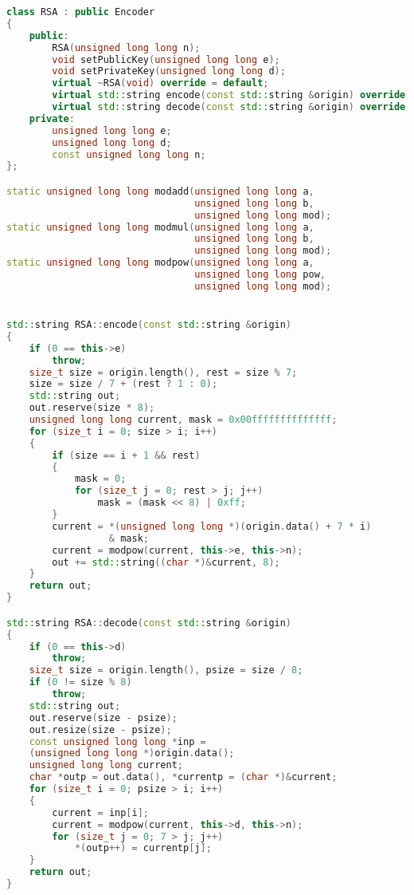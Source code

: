 \begin{lstlisting}[language=c++, caption={Класс, реализующий алгоритм RSA}]
class RSA : public Encoder
{
    public:
        RSA(unsigned long long n);
        void setPublicKey(unsigned long long e);
        void setPrivateKey(unsigned long long d);
        virtual ~RSA(void) override = default;
        virtual std::string encode(const std::string &origin) override;
        virtual std::string decode(const std::string &origin) override;
    private:
        unsigned long long e;
        unsigned long long d;
        const unsigned long long n;
};

static unsigned long long modadd(unsigned long long a,
                                 unsigned long long b,
                                 unsigned long long mod);
static unsigned long long modmul(unsigned long long a,
                                 unsigned long long b,
                                 unsigned long long mod);
static unsigned long long modpow(unsigned long long a,
                                 unsigned long long pow,
                                 unsigned long long mod);


std::string RSA::encode(const std::string &origin)
{
    if (0 == this->e)
        throw;
    size_t size = origin.length(), rest = size % 7;
    size = size / 7 + (rest ? 1 : 0);
    std::string out;
    out.reserve(size * 8);
    unsigned long long current, mask = 0x00ffffffffffffff;
    for (size_t i = 0; size > i; i++)
    {
        if (size == i + 1 && rest)
        {
            mask = 0;
            for (size_t j = 0; rest > j; j++)
                mask = (mask << 8) | 0xff;
        }
        current = *(unsigned long long *)(origin.data() + 7 * i)
                  & mask;
        current = modpow(current, this->e, this->n);
        out += std::string((char *)&current, 8);
    }
    return out;
}

std::string RSA::decode(const std::string &origin)
{
    if (0 == this->d)
        throw;
    size_t size = origin.length(), psize = size / 8;
    if (0 != size % 8)
        throw;
    std::string out;
    out.reserve(size - psize);
    out.resize(size - psize);
    const unsigned long long *inp =
    (unsigned long long *)origin.data();
    unsigned long long current;
    char *outp = out.data(), *currentp = (char *)&current;
    for (size_t i = 0; psize > i; i++)
    {
        current = inp[i];
        current = modpow(current, this->d, this->n);
        for (size_t j = 0; 7 > j; j++)
            *(outp++) = currentp[j];
    }
    return out;
}


\end{lstlisting}
